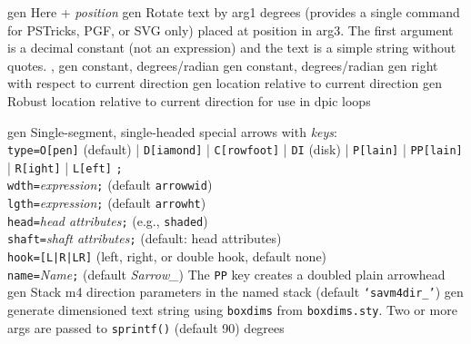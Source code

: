 %
  {gen}%
  {Here + {\sl position}}%
%
  {gen}%
  {Rotate text by arg1 degrees (provides a single command for
   PSTricks, PGF, or SVG only) placed at position in arg3.
   The first argument is a decimal constant (not an expression) and
   the text is a simple string without quotes.
   , }%
%
  {gen}%
  {constant, degrees/radian}%
%
  {gen}%
  {constant, degrees/radian}%
%
  {gen}%
  {right with respect to current direction}%
%
  {gen}%
  {location relative to current direction}%
%
  {gen}%
  {Robust location relative to current direction for use in dpic loops}%

%

%
  {gen}%
  {Single-segment, single-headed special arrows with {\sl keys}:\\
       {\tt type=}{\tt O[pen]} (default)
          | {\tt D[iamond]}
          | {\tt C[rowfoot]}
          | {\tt DI} (disk)
          | {\tt P[lain]}
          | {\tt PP[lain]}
          | {\tt R[ight]}
          | {\tt L[eft]} {\tt ;}\\
       {\tt wdth=}{\sl expression}{\tt ;} (default {\tt arrowwid})\\
       {\tt lgth=}{\sl expression}{\tt ;} (default {\tt arrowht})\\
       {\tt head=}{\sl head attributes}{\tt ;} (e.g., {\tt shaded})\\
       {\tt shaft=}{\sl shaft attributes}{\tt ;} (default: head attributes)\\
       {\tt hook=[L|R|LR]} (left, right, or double hook, default none)\\
       {\tt name=}{\sl Name}{\tt ;} (default {\sl Sarrow\_})
  The {\tt PP} key creates a doubled plain arrowhead
  }%
%
  {gen}%
  {Stack m4 direction parameters in the named stack
    (default {\tt `savm4dir\_'})}%
%
  {gen}%
  {generate dimensioned text string using {\tt{}boxdims} from
    {\tt boxdims.sty}. Two or more args are passed to {\tt sprintf()}
   (default 90) degrees }%

